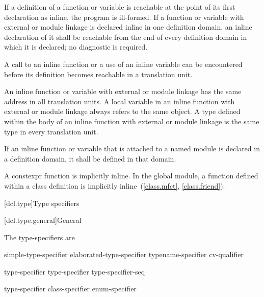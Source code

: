 \pnum
If a definition of a function or variable is reachable
at the point of its
first declaration as inline, the program is ill-formed. If a function or variable
with external or module linkage
is declared inline in one definition domain,
an inline declaration of it shall be reachable
from the end of every definition domain in which it is declared;
no diagnostic is required.
\begin{note}
A call to an inline function or a use of an inline variable can be encountered
before its definition becomes reachable in a translation unit.
\end{note}

\pnum
\begin{note}
An inline function or variable
with external or module linkage
has the same address in all translation units.
A  local variable in an inline
function with external or module linkage
always refers to the same object.
A type defined within the body of an inline
function with external or module linkage is the
same type in every translation unit.
\end{note}

\pnum
If an inline function or variable that is attached to a named module
is declared in a definition domain,
it shall be defined in that domain.
\begin{note}
A constexpr function is implicitly inline.
In the global module, a function defined within a class definition
is implicitly inline~(\ref{class.mfct}, \ref{class.friend}).
\end{note}

[dcl.type]{Type specifiers}%

[dcl.type.general]{General}%

\pnum
The type-specifiers are
%
%
%
\begin{bnf}
\br
  simple-type-specifier\br
  elaborated-type-specifier\br
  typename-specifier\br
  cv-qualifier
\end{bnf}

\begin{bnf}
\br
    type-specifier \br
    type-specifier type-specifier-seq
\end{bnf}

\begin{bnf}
\br
    type-specifier\br
    class-specifier\br
    enum-specifier
\end{bnf}

